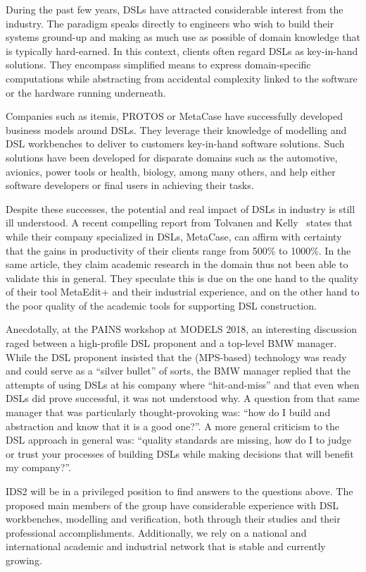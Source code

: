 \documentclass{article}
\begin{document}
During the past few years, DSLs have attracted considerable interest from the
industry. The paradigm speaks directly to engineers who wish to build their
systems ground-up and making as much use as possible of domain knowledge that is
typically hard-earned. In this context, clients often regard DSLs as key-in-hand
solutions. They encompass simplified means to express domain-specific
computations while abstracting from accidental complexity linked to the software or the hardware
running underneath.

Companies such as itemis, PROTOS or MetaCase have successfully developed
business models around DSLs. They leverage their knowledge of modelling and DSL workbenches to
deliver to customers key-in-hand software solutions. Such solutions have been
developed for disparate domains such as the automotive, avionics, power tools or
health, biology, among many others, and help either software developers or final
users in achieving their tasks.

Despite these successes, the potential and real impact of DSLs in industry is
still ill understood. A recent compelling report from Tolvanen and
Kelly~\cite{Tolvanen016} states that while their company specialized in
DSLs, MetaCase, can affirm with certainty that the gains in productivity of
their clients range from 500\% to 1000\%. In the same article, they claim
academic research in the domain thus not been able to validate this in general.
They speculate this is due on the one hand to the quality of their tool
MetaEdit+ and their industrial experience, and on the other hand to the poor
quality of the academic tools for supporting DSL construction.

Anecdotally, at the PAINS workshop at MODELS 2018, an interesting discussion
raged between a high-profile DSL proponent and a top-level BMW manager. While
the DSL proponent insisted that the (MPS-based) technology was ready and could
serve as a ``silver bullet'' of sorts, the BMW manager replied that the attempts of using
DSLs at his company where ``hit-and-miss'' and that even when DSLs did prove
successful, it was not understood why. A question from that same manager that
was particularly thought-provoking was: ``how do I build and abstraction and
know that it is a good one?''. A more general criticism to the DSL approach in
general was: ``quality standards are missing, how do I to judge or trust your
processes of building DSLs while making decisions that will benefit my company?''.

IDS2 will be in a privileged position to find answers to the questions
above. The proposed main members of the group have considerable experience with
DSL workbenches, modelling and verification, both through their studies and their
professional accomplishments. Additionally, we rely on a national and
international academic and industrial network that is stable and currently
growing.
\end{document}
